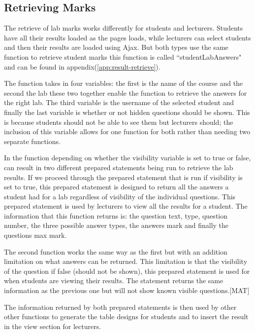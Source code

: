 \documentclass[11pt]{report}
\begin{document}
\subsection{Retrieving Marks}

The retrieve of lab marks works differently for students and lecturers. Students have all their results loaded as the pages loads, while lecturers can select students and then their results are loaded using Ajax. But both types use the same function to retrieve student marks this function is called ``studentLabAnswers" and can be found in appendix(\ref{app:result-retrieve}). 

The function takes in four variables: the first is the name of the course and the second the lab these two together enable the function to retrieve the answers for the right lab. The third variable is the username of the selected student and finally the last variable is  whether or not hidden questions should be shown. This is because students should not be able to see them but lecturers should; the inclusion of this variable allows for one function for both rather than needing two separate functions.



In the function depending on whether the visibility variable is set to true or false, can result in two different prepared statements being run to retrieve the lab results. If we proceed through the prepared statement that is run if visibility is set to true, this prepared statement is designed to return all the answers a student had for a lab regardless of visibility of the individual questions. This prepared statement is used by lecturers to view all the results for a student. The information that this function returns is: the question text, type, question number, the three possible answer types, the answers mark and finally the questions max mark.

The second function works the same way as the first but with an addition limitation on what answers can be returned. This limitation is that the visibility of the question if false (should not be shown), this prepared statement is used for when students are viewing their results. The statement returns the same information as the previous one but will not show known visible questions.[MAT]

The information returned by both prepared statements is then used by other other functions to generate the table designs for students and to insert the result in the view section for lecturers.
\end{document}

